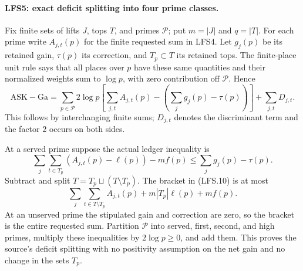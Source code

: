 \paragraph{LFS5: exact deficit splitting into four prime classes.}
\label{claim:LFS5}
Fix finite sets of lifts $J$, tops $T$, and primes $\mathcal P$;
put $m=|J|$ and $q=|T|$.  For each prime write $A_{j,t}(p)$ for
the finite requested sum in LFS4.  Let $g_j(p)$ be its retained
gain, $\tau(p)$ its correction, and $T_p\subset T$ its retained
tops.  The finite-place unit rule says that all places over $p$
have these same quantities and their normalized weights sum to
$\log p$, with zero contribution off $\mathcal P$.  Hence
\[
 \mathrm{ASK}-\mathrm{Ga}
 =\sum_{p\in\mathcal P}2\log p\left[
       \sum_{j,t}A_{j,t}(p)-\left(\sum_jg_j(p)-\tau(p)\right)
                                 \right]+\sum_{j,t}D_{j,t}.    \tag{LFS.10}
\]
This follows by interchanging finite sums; $D_{j,t}$ denotes the
discriminant term and the factor $2$ occurs on both sides.

At a served prime suppose the actual ledger inequality is
\[
 \sum_j\sum_{t\in T_p}(A_{j,t}(p)-\ell(p))-mf(p)
        \le\sum_jg_j(p)-\tau(p).
\]
Subtract and split $T=T_p\sqcup(T\setminus T_p)$.  The bracket
in (LFS.10) is at most
\[
 \sum_j\sum_{t\in T\setminus T_p}A_{j,t}(p)
                  +m|T_p|\ell(p)+mf(p).                       \tag{LFS.11}
\]
At an unserved prime the stipulated gain and correction are zero,
so the bracket is the entire requested sum.  Partition
$\mathcal P$ into served, first, second, and high primes, multiply
these inequalities by $2\log p\ge0$, and add them.  This proves
the source's deficit splitting with no positivity assumption on
the net gain and no change in the sets $T_p$.

